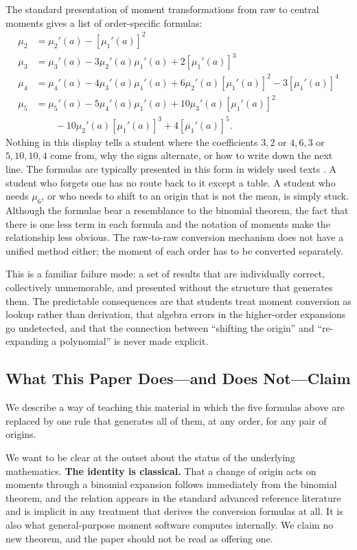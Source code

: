 \documentclass[
  12pt]{article}
\begin{document}
The standard presentation of moment transformations from raw to central moments gives a list of order-specific formulas:
\begin{align*}
\mu_2 &= \mu_2'(a) - \left[\mu_1'(a)\right]^2 \\[4pt]
\mu_3 &= \mu_3'(a) - 3\mu_2'(a)\mu_1'(a) + 2\left[\mu_1'(a)\right]^3 \\[4pt]
\mu_4 &= \mu_4'(a) - 4\mu_3'(a)\mu_1'(a) + 6\mu_2'(a)\left[\mu_1'(a)\right]^2 - 3\left[\mu_1'(a)\right]^4 \\[4pt]
\mu_5 &= \mu_5'(a) - 5\mu_4'(a)\mu_1'(a) + 10\mu_3'(a)\left[\mu_1'(a)\right]^2 \\[2pt]
      &\qquad - 10\mu_2'(a)\left[\mu_1'(a)\right]^3 + 4\left[\mu_1'(a)\right]^5.
\end{align*}
Nothing in this display tells a student where the coefficients $3, 2$ or $4, 6, 3$ or $5, 10, 10, 4$ come from, why the signs alternate, or how to write down the next line. The formulas are typically presented in this form in widely used texts \citep{cramer1946, mood1974, johnson1994}. A student who forgets one has no route back to it except a table. A student who needs $\mu_6$, or who needs to shift to an origin that is not the mean, is simply stuck. Although the formulae bear a resemblance to the binomial theorem, the fact that there is one less term in each formula and the notation of moments make the relationship less obvious. The raw-to-raw conversion mechanism does not have a unified method either; the moment of each order has to be converted separately.

This is a familiar failure mode: a set of results that are individually correct, collectively unmemorable, and presented without the structure that generates them. The predictable consequences are that students treat moment conversion as lookup rather than derivation, that algebra errors in the higher-order expansions go undetected, and that the connection between ``shifting the origin'' and ``re-expanding a polynomial'' is never made explicit.

\subsection{What This Paper Does---and Does Not---Claim}

We describe a way of teaching this material in which the five formulas above are replaced by one rule that generates all of them, at any order, for any pair of origins.

We want to be clear at the outset about the status of the underlying mathematics. \textbf{The identity is classical.} That a change of origin acts on moments through a binomial expansion follows immediately from the binomial theorem, and the relation appears in the standard advanced reference literature \citep{kendall1977} and is implicit in any treatment that derives the conversion formulas at all. It is also what general-purpose moment software computes internally. We claim no new theorem, and the paper should not be read as offering one.
\end{document}
